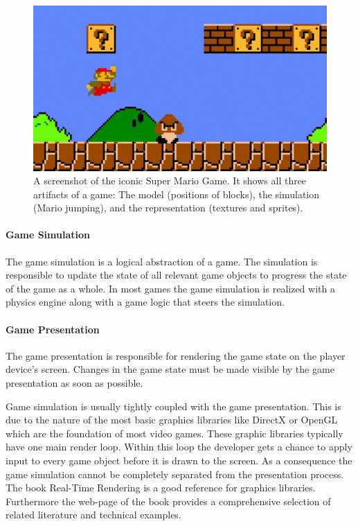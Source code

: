 \begin{figure}
	\centering
	\includegraphics[width=\textwidth]{images/super_mario}
	\caption{A screenshot of the iconic Super Mario Game. It shows all three
	artifacts of a game: The model (positions of blocks), the simulation (Mario
	jumping), and the representation (textures and \glspl{sprite}).}
	\label{fig:super_mario}
\end{figure}

\paragraph{Game Simulation}

The game simulation is a logical abstraction of a game. The simulation is
responsible to update the state of all relevant game objects to progress the
state of the game as a whole. In most games the game simulation is realized with
a physics engine along with a game logic that steers the simulation.

\paragraph{Game Presentation}

The game presentation is responsible for rendering the game state on the player
device's screen. Changes in the game state must be made visible by the game
presentation as soon as possible.

Game simulation is usually tightly coupled with the game presentation. This is
due to the nature of the most basic graphics libraries like DirectX or OpenGL
which are the foundation of most video games. These graphic libraries typically
have one main render loop. Within this loop the developer gets a chance to apply
input to every game object before it is drawn to the screen. As a consequence
the game simulation cannot be completely separated from the presentation
process. The book Real-Time Rendering \cite{RTR3} is a good reference for
graphics libraries. Furthermore the web-page of the book provides a
comprehensive selection of related literature and technical examples.

